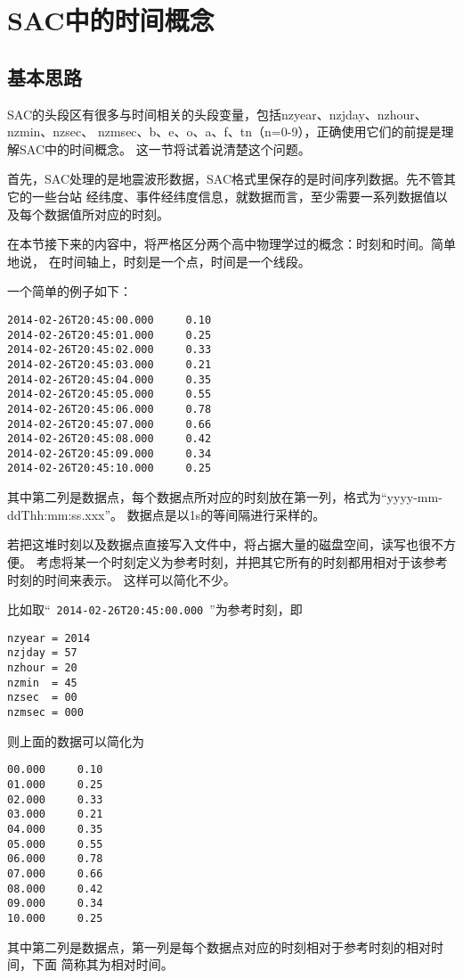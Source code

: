 \section{SAC中的时间概念}
\label{sec:sac-time}

\subsection{基本思路}
SAC的头段区有很多与时间相关的头段变量，包括nzyear、nzjday、nzhour、nzmin、nzsec、
nzmsec、b、e、o、a、f、tn（n=0-9），正确使用它们的前提是理解SAC中的时间概念。
这一节将试着说清楚这个问题。

首先，SAC处理的是地震波形数据，SAC格式里保存的是时间序列数据。先不管其它的一些台站
经纬度、事件经纬度信息，就数据而言，至少需要一系列数据值以及每个数据值所对应的时刻。

在本节接下来的内容中，将严格区分两个高中物理学过的概念：时刻和时间。简单地说，
在时间轴上，时刻是一个点，时间是一个线段。

一个简单的例子如下：
\begin{lstlisting}[style=Bash]
2014-02-26T20:45:00.000     0.10
2014-02-26T20:45:01.000     0.25
2014-02-26T20:45:02.000     0.33
2014-02-26T20:45:03.000     0.21
2014-02-26T20:45:04.000     0.35
2014-02-26T20:45:05.000     0.55
2014-02-26T20:45:06.000     0.78
2014-02-26T20:45:07.000     0.66
2014-02-26T20:45:08.000     0.42
2014-02-26T20:45:09.000     0.34
2014-02-26T20:45:10.000     0.25
\end{lstlisting}
其中第二列是数据点，每个数据点所对应的时刻放在第一列，格式为``yyyy-mm-ddThh:mm:ss.xxx''。
数据点是以1s的等间隔进行采样的。

若把这堆时刻以及数据点直接写入文件中，将占据大量的磁盘空间，读写也很不方便。
考虑将某一个时刻定义为参考时刻，并把其它所有的时刻都用相对于该参考时刻的时间来表示。
这样可以简化不少。

比如取``~\lstinline{2014-02-26T20:45:00.000}~''为参考时刻，即
\begin{lstlisting}[style=Bash]
nzyear = 2014
nzjday = 57
nzhour = 20
nzmin  = 45
nzsec  = 00
nzmsec = 000
\end{lstlisting}
则上面的数据可以简化为
\begin{lstlisting}[style=Bash]
00.000     0.10
01.000     0.25
02.000     0.33
03.000     0.21
04.000     0.35
05.000     0.55
06.000     0.78
07.000     0.66
08.000     0.42
09.000     0.34
10.000     0.25
\end{lstlisting}
其中第二列是数据点，第一列是每个数据点对应的时刻相对于参考时刻的相对时间，下面
简称其为相对时间。


